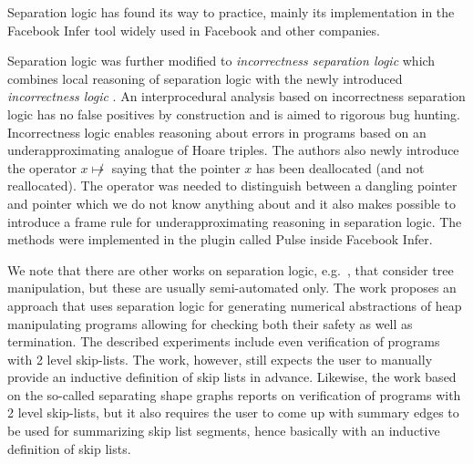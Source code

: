 	  Separation logic has found its way to practice, mainly its implementation
	  in the Facebook Infer tool widely used in Facebook \cite{www:fbinfer} and other companies.

          Separation logic was further modified to \emph{incorrectness separation logic} \cite{soa-isl} which
          combines local reasoning of separation logic with the newly introduced \emph{incorrectness logic} \cite{soa-isl}.
          An interprocedural analysis based on incorrectness separation logic has no false positives by construction
          and is aimed to rigorous bug hunting.
          Incorrectness logic enables reasoning about errors in programs based on an underapproximating analogue
          of Hoare triples.
          The authors also newly introduce the operator $x \not\mapsto$ saying that the pointer $x$ has been deallocated
          (and not reallocated). The operator was needed to distinguish between a dangling pointer and pointer which we do not
          know anything about and it also makes possible to introduce a frame rule
          for underapproximating reasoning in separation logic.
          The methods were implemented in the plugin called Pulse inside Facebook Infer.

          We note that there
          are other works on separation logic, e.g.~\cite{ndqc07}, that consider tree
          manipulation, but these are usually semi-automated only. 
          The work \cite{thor10} proposes an approach that uses separation logic for
          generating numerical abstractions of heap manipulating programs allowing for
          checking both their safety as well as termination. The described experiments
          include even verification of programs with 2 level skip-lists.
          The work, however,
          still expects the user to manually provide an inductive definition of skip lists
          in advance. Likewise, the work \cite{sas07:chang_rival_necula} based on the so-called separating
          shape graphs reports on verification of programs with 2 level skip-lists, but it
          also requires the user to come up with summary edges to be used for summarizing
          skip list segments, hence basically with an inductive definition of skip lists.

